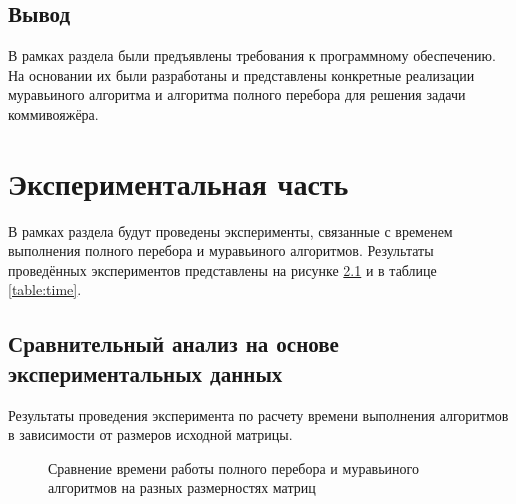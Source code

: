 \documentclass[a4paper,12pt]{report}
\begin{document}
	    \section{Вывод}
	
	В рамках раздела были предъявлены требования к программному обеспечению. 
	На основании их были разработаны и представлены конкретные реализации муравьиного алгоритма и алгоритма полного перебора для решения задачи коммивояжёра.

    \newpage

    \chapter{Экспериментальная часть}
        \label{sec:experimental_part}

        	В рамках раздела будут проведены эксперименты, связанные с временем выполнения полного перебора и муравьиного алгоритмов. 
        	Результаты проведённых экспериментов представлены на рисунке \ref{graph:matr_size} и в таблице \ref{table:time}.

	\section{Сравнительный анализ на основе экспериментальных данных}

        Результаты проведения эксперимента по расчету времени выполнения алгоритмов в зависимости от размеров исходной матрицы.
        \begin{figure}[h!]
        \caption{Сравнение времени работы полного перебора и муравьиного алгоритмов на разных размерностях матриц}
        \label{graph:matr_size}
        \end{figure}
\end{document}
